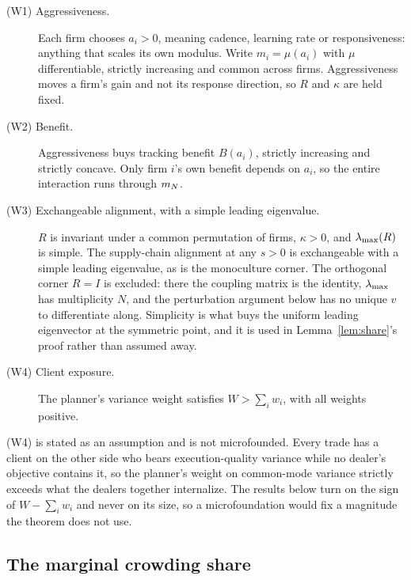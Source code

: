 \begin{description}
\item[(W1) Aggressiveness.] Each firm chooses $a_i > 0$, meaning cadence, learning rate or responsiveness: anything that scales its own modulus. Write $m_i = \mu(a_i)$ with $\mu$ differentiable, strictly increasing and common across firms. Aggressiveness moves a firm's gain and not its response direction, so $R$ and $\kappa$ are held fixed.
\item[(W2) Benefit.] Aggressiveness buys tracking benefit $B(a_i)$, strictly increasing and strictly concave. Only firm $i$'s own benefit depends on $a_i$, so the entire interaction runs through $m_N$.
\item[(W3) Exchangeable alignment, with a simple leading eigenvalue.] $R$ is invariant under a common permutation of firms, $\kappa>0$, and $\lambda_{\max}(R)$ is simple. The supply-chain alignment at any $s>0$ is exchangeable with a simple leading eigenvalue, as is the monoculture corner. The orthogonal corner $R=I$ is excluded: there the coupling matrix is the identity, $\lambda_{\max}$ has multiplicity $N$, and the perturbation argument below has no unique $v$ to differentiate along. Simplicity is what buys the uniform leading eigenvector at the symmetric point, and it is used in Lemma~\ref{lem:share}'s proof rather than assumed away.
\item[(W4) Client exposure.] The planner's variance weight satisfies $W > \sum_i w_i$, with all weights positive.
\end{description}

(W4) is stated as an assumption and is not microfounded. Every trade has a client on the other side who bears execution-quality variance while no dealer's objective contains it, so the planner's weight on common-mode variance strictly exceeds what the dealers together internalize. The results below turn on the sign of $W - \sum_i w_i$ and never on its size, so a microfoundation would fix a magnitude the theorem does not use.

\subsection{The marginal crowding share}

